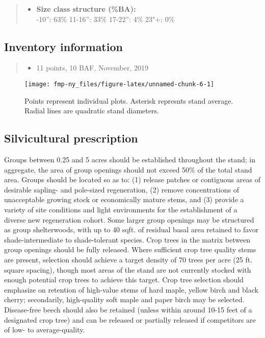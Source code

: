 \documentclass[]{tufte-handout}
\providecommand{\tightlist}{%
  \setlength{\itemsep}{0pt}\setlength{\parskip}{0pt}}
\begin{document}
\begin{quote}
\begin{itemize}
\tightlist
\item
  \textbf{Size class structure (\%BA):}\\
  \vspace{2pt} -10'': 63\% \textbar{} 11-16'': 33\% \textbar{}
  17-22'': 4\% \textbar{} 23"+: 0\%
\end{itemize}
\end{quote}

\subsection{Inventory information}\label{inventory-information}

\begin{quote}
\begin{itemize}
\tightlist
\item
  11 points, 10 BAF, November, 2019
\end{itemize}
\end{quote}

\begin{figure}
\texttt{[image: fmp-ny\_files/figure-latex/unnamed-chunk-6-1]} \caption[Points represent individual plots]{Points represent individual plots. Asterisk represnts stand average. Radial lines are quadratic stand diameters.}\label{fig:unnamed-chunk-6}
\end{figure}

\subsection{Silvicultural
prescription}\label{silvicultural-prescription}

Groups between 0.25 and 5 acres should be established throughout the
stand; in aggregate, the area of group openings should not exceed 50\%
of the total stand area. Groups should be located so as to: (1) release
patches or contiguous areas of desirable sapling- and pole-sized
regeneration, (2) remove concentrations of unacceptable growing stock or
economically mature stems, and (3) provide a variety of site conditions
and light environments for the establishment of a diverse new
regeneration cohort. Some larger group openings may be structured as
group shelterwoods, with up to 40 sqft. of residual basal area retained
to favor shade-intermediate to shade-tolerant species. Crop trees in the
matrix between group openings should be fully released. Where sufficient
crop tree quality stems are present, selection should achieve a target
density of 70 trees per acre (25 ft. square spacing), though most areas
of the stand are not currently stocked with enough potential crop trees
to achieve this target. Crop tree selection should emphasize on
retention of high-value stems of hard maple, yellow birch and black
cherry; secondarily, high-quality soft maple and paper birch may be
selected. Disease-free beech should also be retained (unless within
around 10-15 feet of a designated crop tree) and can be released or
partially released if competitors are of low- to average-quality.
\end{document}
